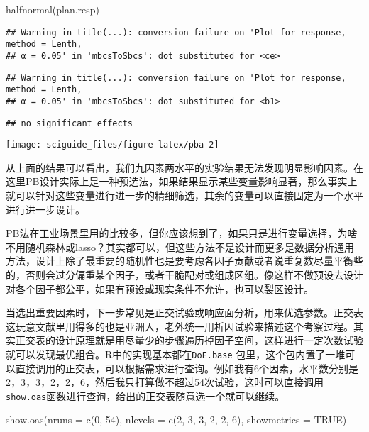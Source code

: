\documentclass[]{tufte-book}
\newenvironment{Shaded}{}{}
\newcommand{\AttributeTok}[1]{\textcolor[rgb]{0.49,0.56,0.16}{#1}}
\newcommand{\ConstantTok}[1]{\textcolor[rgb]{0.53,0.00,0.00}{#1}}
\newcommand{\DecValTok}[1]{\textcolor[rgb]{0.25,0.63,0.44}{#1}}
\newcommand{\FunctionTok}[1]{\textcolor[rgb]{0.02,0.16,0.49}{#1}}
\newcommand{\NormalTok}[1]{#1}
\begin{document}
\begin{Shaded}
\begin{Highlighting}[]
\FunctionTok{halfnormal}\NormalTok{(plan.resp)}
\end{Highlighting}
\end{Shaded}

\begin{verbatim}
## Warning in title(...): conversion failure on 'Plot for response, method = Lenth,
## α = 0.05' in 'mbcsToSbcs': dot substituted for <ce>
\end{verbatim}

\begin{verbatim}
## Warning in title(...): conversion failure on 'Plot for response, method = Lenth,
## α = 0.05' in 'mbcsToSbcs': dot substituted for <b1>
\end{verbatim}

\begin{verbatim}
## no significant effects
\end{verbatim}

\texttt{[image: sciguide\_files/figure-latex/pba-2]}

从上面的结果可以看出，我们九因素两水平的实验结果无法发现明显影响因素。在这里PB设计实际上是一种预选法，如果结果显示某些变量影响显著，那么事实上就可以针对这些变量进行进一步的精细筛选，其余的变量可以直接固定为一个水平进行进一步设计。

PB法在工业场景里用的比较多，但你应该想到了，如果只是进行变量选择，为啥不用随机森林或lasso？其实都可以，但这些方法不是设计而更多是数据分析通用方法，设计上除了最重要的随机性也是要考虑各因子贡献或者说重复数尽量平衡些的，否则会过分偏重某个因子，或者干脆配对或组成区组。像这样不做预设去设计对各个因子都公平，如果有预设或现实条件不允许，也可以裂区设计。

当选出重要因素时，下一步常见是正交试验或响应面分析，用来优选参数。正交表这玩意文献里用得多的也是亚洲人，老外统一用析因试验来描述这个考察过程。其实正交表的设计原理就是用尽量少的步骤遍历掉因子空间，这样进行一定次数试验就可以发现最优组合。R中的实现基本都在\texttt{DoE.base} 包里，这个包内置了一堆可以直接调用的正交表，可以根据需求进行查询。例如我有6个因素，水平数分别是2，3，3，2，2，6，然后我只打算做不超过54次试验，这时可以直接调用\texttt{show.oas}函数进行查询，给出的正交表随意选一个就可以继续。

\begin{Shaded}
\begin{Highlighting}[]
\FunctionTok{show.oas}\NormalTok{(}\AttributeTok{nruns =} \FunctionTok{c}\NormalTok{(}\DecValTok{0}\NormalTok{, }\DecValTok{54}\NormalTok{), }\AttributeTok{nlevels =} \FunctionTok{c}\NormalTok{(}\DecValTok{2}\NormalTok{, }\DecValTok{3}\NormalTok{, }\DecValTok{3}\NormalTok{, }\DecValTok{2}\NormalTok{, }\DecValTok{2}\NormalTok{, }\DecValTok{6}\NormalTok{), }\AttributeTok{showmetrics =} \ConstantTok{TRUE}\NormalTok{)}
\end{Highlighting}
\end{Shaded}
\end{document}
